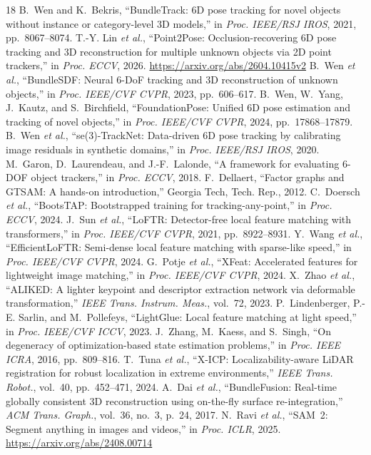 \documentclass[10pt,journal]{IEEEtran}
\begin{document}
\begin{thebibliography}{18}
 B.~Wen and K.~Bekris, ``BundleTrack: 6D pose tracking for novel objects without instance or category-level 3D models,'' in \emph{Proc. IEEE/RSJ IROS}, 2021, pp.~8067--8074.
 T.-Y. Lin \emph{et al.}, ``Point2Pose: Occlusion-recovering 6D pose tracking and 3D reconstruction for multiple unknown objects via 2D point trackers,'' in \emph{Proc. ECCV}, 2026. \url{https://arxiv.org/abs/2604.10415v2}
 B.~Wen \emph{et al.}, ``BundleSDF: Neural 6-DoF tracking and 3D reconstruction of unknown objects,'' in \emph{Proc. IEEE/CVF CVPR}, 2023, pp.~606--617.
 B.~Wen, W.~Yang, J.~Kautz, and S.~Birchfield, ``FoundationPose: Unified 6D pose estimation and tracking of novel objects,'' in \emph{Proc. IEEE/CVF CVPR}, 2024, pp.~17868--17879.
 B.~Wen \emph{et al.}, ``se(3)-TrackNet: Data-driven 6D pose tracking by calibrating image residuals in synthetic domains,'' in \emph{Proc. IEEE/RSJ IROS}, 2020.
 M.~Garon, D.~Laurendeau, and J.-F.~Lalonde, ``A framework for evaluating 6-DOF object trackers,'' in \emph{Proc. ECCV}, 2018.
 F.~Dellaert, ``Factor graphs and GTSAM: A hands-on introduction,'' Georgia Tech, Tech. Rep., 2012.
 C.~Doersch \emph{et al.}, ``BootsTAP: Bootstrapped training for tracking-any-point,'' in \emph{Proc. ECCV}, 2024.
 J.~Sun \emph{et al.}, ``LoFTR: Detector-free local feature matching with transformers,'' in \emph{Proc. IEEE/CVF CVPR}, 2021, pp.~8922--8931.
 Y.~Wang \emph{et al.}, ``EfficientLoFTR: Semi-dense local feature matching with sparse-like speed,'' in \emph{Proc. IEEE/CVF CVPR}, 2024.
 G.~Potje \emph{et al.}, ``XFeat: Accelerated features for lightweight image matching,'' in \emph{Proc. IEEE/CVF CVPR}, 2024.
 X.~Zhao \emph{et al.}, ``ALIKED: A lighter keypoint and descriptor extraction network via deformable transformation,'' \emph{IEEE Trans. Instrum. Meas.}, vol.~72, 2023.
 P.~Lindenberger, P.-E. Sarlin, and M.~Pollefeys, ``LightGlue: Local feature matching at light speed,'' in \emph{Proc. IEEE/CVF ICCV}, 2023.
 J.~Zhang, M.~Kaess, and S.~Singh, ``On degeneracy of optimization-based state estimation problems,'' in \emph{Proc. IEEE ICRA}, 2016, pp.~809--816.
 T.~Tuna \emph{et al.}, ``X-ICP: Localizability-aware LiDAR registration for robust localization in extreme environments,'' \emph{IEEE Trans. Robot.}, vol.~40, pp.~452--471, 2024.
 A.~Dai \emph{et al.}, ``BundleFusion: Real-time globally consistent 3D reconstruction using on-the-fly surface re-integration,'' \emph{ACM Trans. Graph.}, vol.~36, no.~3, p.~24, 2017.
 N.~Ravi \emph{et al.}, ``SAM~2: Segment anything in images and videos,'' in \emph{Proc. ICLR}, 2025. \url{https://arxiv.org/abs/2408.00714}
\end{thebibliography}
\end{document}
